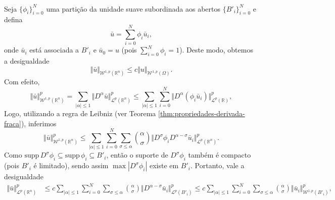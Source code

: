 \documentclass[a4paper, 11pt]{book}
\theoremstyle{definition}
\newcommand{\bR}{\mathbb{R}}
\newcommand{\cL}{\mathcal{L}}
\newcommand{\cW}{\mathcal{W}}
\newcommand{\supp}{\mathrm{supp}\,}
\begin{document}
\begin{prf}
\begin{figure}
        \caption{~}
        \label{fig:coberturafronteirab0}
    \end{figure}


    Seja $\{\phi_i\}_{i=0}^N$ uma partição da unidade suave subordinada aos abertos $\{B'_i\}_{i=0}^N$ e defina
    \begin{equation}
        \bar u = \sum_{i=0}^N \phi_i \bar u_i,
    \end{equation}
    onde $\bar u_i$ está associada a $B'_i$ e $\bar u_0 = u$ (pois $\sum_{i=0}^N \phi_i = 1$). Deste modo, obtemos a desigualdade
    \begin{equation} \label{eq:xmmx}
        \Vert \bar u \Vert_{\cW^{1,p}(\bR^n)} \leqslant c \Vert u \Vert_{\cW^{1,p}(\Omega)}.
    \end{equation}
    Com efeito,
    \[
        \Vert \bar u \Vert^p_{\cW^{1,p}(\bR^n)} = \sum_{|\alpha| \leqslant 1} \Vert D^\alpha \bar u \Vert^p_{\cL^p(\bR^n)}
        \leqslant \sum_{|\alpha| \leqslant 1} \sum_{i=0}^N \Vert D^\alpha (\phi_i \bar u_i) \Vert_{\cL^p(\bR)}^p,
    \]
    Logo, utilizando a regra de Leibniz (ver Teorema \ref{thm:propriedades-derivada-fraca}), inferimos
    \[
        \Vert \bar u \Vert_{\cW^{1,p}(\bR^n)}^p \leqslant \sum_{|\alpha| \leqslant 1} \sum_{i=0}^{N} \sum_{\sigma \leqslant \alpha} \binom{\alpha}{\sigma} \Vert D^\sigma \phi_i D^{\alpha - \sigma} \bar u_i \Vert_{\cL^p(\bR^n)}^p.
    \]
    Como $\supp D^\sigma \phi_i \subseteq \supp \phi_i \subseteq B'_i$, então o suporte de $D^\sigma \phi_i$ também é compacto (pois $B'_i$ é limitado), sendo assim $\max |D^\sigma \phi_i|$ existe em $B'_i$.
    Portanto, vale a desigualdade
    \[
        \begin{aligned}
            \Vert \bar u \Vert_{\cL^p(\bR^n)}^p &\leqslant c\sum_{|\alpha| \leqslant 1} \sum_{i=0}^{N} \sum_{\sigma \leqslant \alpha} \binom{\alpha}{\sigma} \Vert D^{\alpha - \sigma} \bar u_i \Vert_{\cL^p(B'_i)}^p \leqslant c\sum_{|\alpha| \leqslant 1} \sum_{i=0}^{N} \sum_{\sigma \leqslant \alpha} \binom{\alpha}{\sigma} \Vert \bar u_i \Vert_{\cW^{1,p}(B'_i)}^p,

\end{aligned}\]
\end{prf}
\end{document}
